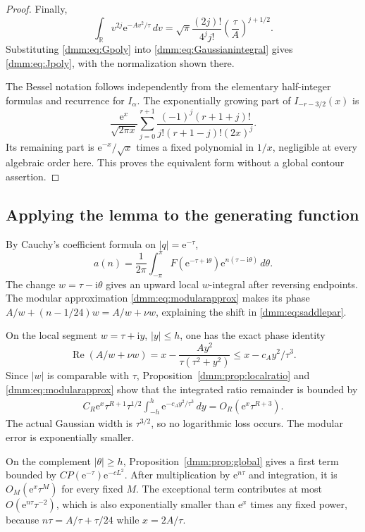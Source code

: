 \documentclass[11pt,letterpaper]{article}
\numberwithin{equation}{section}
\theoremstyle{definition}\newtheorem{definition}[theorem]{Definition}
\theoremstyle{remark}\newtheorem{remark}[theorem]{Remark}
\newcommand{\R}{\mathbb R}
\newcommand{\ii}{\mathrm i}
\newcommand{\ee}{\mathrm e}
\DeclareMathOperator{\Rea}{Re}
\begin{document}
\begin{proof}
Finally,
\begin{equation}\label{dmm:eq:moments}
\int_\R v^{2j}\ee^{-Av^2/\tau}\,dv
=\sqrt\pi\frac{(2j)!}{4^j j!}
\left(\frac\tau A\right)^{j+1/2}.
\end{equation}
Substituting \eqref{dmm:eq:Gpoly} into \eqref{dmm:eq:Gaussianintegral} gives \eqref{dmm:eq:Jpoly}, with the normalization shown there.

The Bessel notation follows independently from the elementary half-integer formulas and recurrence for $I_\alpha$. The exponentially growing part of $I_{-r-3/2}(x)$ is
\[
\frac{\ee^x}{\sqrt{2\pi x}}
\sum_{j=0}^{r+1}
\frac{(-1)^j(r+1+j)!}{j!(r+1-j)!(2x)^j}.
\]
Its remaining part is $\ee^{-x}/\sqrt x$ times a fixed polynomial in $1/x$, negligible at every algebraic order here. This proves the equivalent form without a global contour assertion.
\end{proof}

\subsection{Applying the lemma to the generating function}
By Cauchy's coefficient formula on $|q|=\ee^{-\tau}$,
\begin{equation}\label{dmm:eq:Cauchy}
a(n)=\frac1{2\pi}\int_{-\pi}^{\pi}
F(\ee^{-\tau+\ii\theta})\ee^{n(\tau-\ii\theta)}\,d\theta.
\end{equation}
The change $w=\tau-\ii\theta$ gives an upward local $w$-integral after reversing endpoints. The modular approximation \eqref{dmm:eq:modularapprox} makes its phase
$A/w+(n-1/24)w=A/w+\nu w$, explaining the shift in \eqref{dmm:eq:saddlepar}.

On the local segment $w=\tau+\ii y$, $|y|\le h$, one has the exact phase identity
\begin{equation}\label{dmm:eq:gaussiandecay}
\Rea(A/w+\nu w)
=x-\frac{Ay^2}{\tau(\tau^2+y^2)}
\le x-c_Ay^2/\tau^3.
\end{equation}
Since $|w|$ is comparable with $\tau$, Proposition~\ref{dmm:prop:localratio} and \eqref{dmm:eq:modularapprox} show that the integrated ratio remainder is bounded by
\begin{align}\label{dmm:eq:remainderintegral}
C_R\ee^x\tau^{R+1}\tau^{1/2}
\int_{-h}^{h}\ee^{-c_Ay^2/\tau^3}\,dy
=O_R(\ee^x\tau^{R+3}).
\end{align}
The actual Gaussian width is $\tau^{3/2}$, so no logarithmic loss occurs. The modular error is exponentially smaller.

On the complement $|\theta|\ge h$, Proposition~\ref{dmm:prop:global} gives a first term bounded by
$CP(\ee^{-\tau})\ee^{-cL^2}$. After multiplication by $\ee^{n\tau}$ and integration, it is $O_M(\ee^x\tau^M)$ for every fixed $M$. The exceptional term contributes at most
$O(\ee^{n\tau}\tau^{-2})$, which is also exponentially smaller than $\ee^x$ times any fixed power, because $n\tau=A/\tau+\tau/24$ while $x=2A/\tau$.
\end{document}
